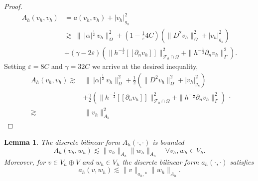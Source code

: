 \documentclass[11pt]{article}
\newtheorem{lemma}[theorem]{Lemma}
\theoremstyle{remark}
\newcommand{\jump}[1]{\left[\!\left[ #1 \right]\!\right]}
\newcommand{\abs}[1]{\left\lvert #1 \right\rvert}
\numberwithin{equation}{section}
\begin{document}
\begin{proof}
    \begin{equation}
        \begin{split}
     A_{h}( v_{h},v_{h}) & = a( v_{h},v_{h}) + \abs{ v_{h} }_{g_{h}}^{2} \\
     & \gtrsim    \   \| \ |\alpha|^{\frac{1}{2}} \  v_{h}  \|_{   \Omega   }^{2} + (1  - \frac{1}{\varepsilon } 4C)  (\| D^2 v_{h} \|_{ \Omega  }^{ 2 }  + \abs{ v_{h} } _{ g_{h} }^{2  } )  \\
                       & + (\gamma - 2\varepsilon  )\left( \|h^{-\frac{1}{2}}  \jump{ \partial _{n} v_{h} }\|_{\mathcal{F} _{h}^{}\cap \Omega   }^{ 2 } + \| h^{-\frac{1}{2}} \partial _{n} v_{h} \|_{ \Gamma  }^{ 2} \right)        .
        \end{split}
    \end{equation}
    Setting $\varepsilon = 8C$ and $\gamma = 32C $ we arrive at the desired inequality,
    \begin{equation}
        \begin{split}
           A_{h}( v_{h},v_{h})  \gtrsim & \   \| \ |\alpha|^{\frac{1}{2}} \    v_{h}  \|_{  \Omega   }^{2} + \frac{1}{2}  (\| D^2 v_{h} \|_{ \Omega  }^{ 2 }  + \abs{ v_{h} } _{ g_{h} }^{2  } )  \\
                       & + \frac{\gamma }{2}\left( \|h^{-\frac{1}{2}}  \jump{ \partial _{n} v_{h} }\|_{\mathcal{F} _{h}^{}\cap \Omega   }^{ 2 } + \| h^{-\frac{1}{2}} \partial _{n} v_{h} \|_{ \Gamma  }^{ 2} \right) \\
                        \gtrsim & \  \| v_{h} \|_{ A_{h} }^{2  }
        \end{split}
.
    \end{equation}
\end{proof}


\begin{lemma}
    \label{lemma:bi_Ah_bounded}
    The discrete bilinear form $A_{h}( \cdot ,\cdot ) $ is bounded
    \begin{equation}
    \label{eq:bi_A_h_bounded}
     A_{h}( v_{h},w_{h}) \lesssim \| v_{h} \|_{A_{h}  }^{  }\| w_{h} \|_{A_{h}  }^{  } \quad   \forall v_{h},w_{h} \in V_{h}.
    \end{equation}
    Moreover, for $v \in V_{h} \oplus V$  and $w_{h} \in V_{h}$ the discrete bilinear form $a_{h}( \cdot ,\cdot  ) $ satisfies
    \begin{equation}
        \label{eq:bi_a_h_bounded}
        a_{h} ( v,w_{h}) \lesssim \| v \|_{ a_{h},* }^{  } \| w_{h} \|_{ A_{h} }^{  }.
    \end{equation}
\end{lemma}
\end{document}
